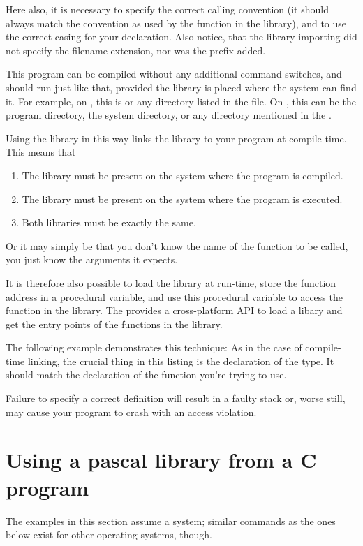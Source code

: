 Here also, it is necessary to specify the correct calling convention (it
should always match the convention as used by the function in the library),
and to use the correct casing for your declaration. Also notice, that
the library importing did not specify the filename extension, nor
was the  prefix added.

This program can be compiled without any additional command-switches,
and should run just like that, provided the library is placed where
the system can find it. For example, on \linux, this is  or any
directory listed in the  file. On \windows, this
can be the program directory, the \windows system directory, or any directory
mentioned in the .

Using the library in this way links the library to your program at compile
time. This means that
\begin{enumerate}
\item The library must be present on the system where the program is
compiled.
\item The library must be present on the system where the program is
executed.
\item Both libraries must be exactly the same.
\end{enumerate}
Or it may simply be that you don't know the name of the function to
 be called, you just know the arguments it expects.

It is therefore also possible to load the library at run-time, store
the function address in a procedural variable, and use this procedural
variable to access the function in the library. The  provides
a cross-platform API to load a libary and get the entry points of the
functions in the library. 

The following example demonstrates this technique:
As in the case of compile-time linking, the crucial thing in this
listing is the declaration of the  type.
It should match the declaration of the function you're trying to use.

Failure to specify a correct definition will result in a faulty stack or,
worse still, may cause your program to crash with an access violation.

\section{Using a pascal library from a C program}

\begin{remark}The examples in this section assume a \linux system; similar commands
as the ones below exist for other operating systems, though.
\end{remark}

